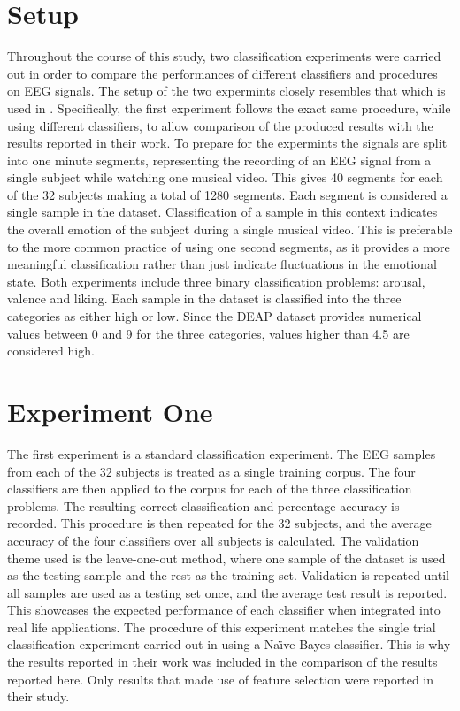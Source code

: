 \documentclass[12pt, a4paper, fleqn]{memoir}%
\begin{document}
\section{Setup}
\label{sec:setup}
Throughout the course of this study, two classification experiments were carried out in order to compare the performances of different classifiers and procedures on EEG signals. The setup of the two expermints closely resembles that which is used in \cite{koelstra2012deap}. Specifically, the first experiment follows the exact same procedure, while using different classifiers, to allow comparison of the produced results with the results reported in their work. To prepare for the expermints the signals are split into one minute segments, representing the recording of an EEG signal from a single subject while watching one musical video. This gives 40 segments for each of the 32 subjects making a total of 1280 segments. Each segment is considered a single sample in the dataset. Classification of a sample in this context indicates the overall emotion of the subject during a single musical video. This is preferable to the more common practice of using one second segments, as it provides a more meaningful classification rather than just indicate fluctuations in the  emotional state. Both experiments include three binary classification problems: arousal, valence and liking. Each sample in the dataset is classified into the three categories as either high or low. Since the DEAP dataset provides numerical values between 0 and 9 for the three categories, values higher than 4.5 are considered high.

\section{Experiment One}
\label{sec:exp1}
The first experiment is a standard classification experiment. The EEG samples from each of the 32 subjects is treated as a single training corpus. The four classifiers are then applied to the corpus for each of the three classification problems. The resulting correct classification and percentage accuracy is recorded. This procedure is then repeated for the 32 subjects, and the average accuracy of the four classifiers over all subjects is calculated. The validation theme used is the leave-one-out method, where one sample of the dataset is used as the testing sample and the rest as the training set. Validation is repeated until all samples are used as a testing set once, and the average test result is reported. This showcases the expected performance of each classifier when integrated into real life applications. The procedure of this experiment matches the single trial classification experiment carried out in \cite{koelstra2012deap} using a Na\"{\i}ve Bayes classifier. This is why the results reported in their work was included in the comparison of the results reported here. Only results that made use of feature selection were reported in their study.
\end{document}
